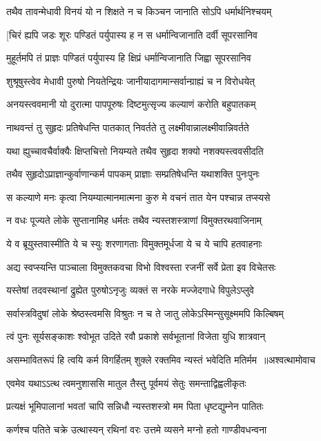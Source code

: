 \twolineshloka
{तथैव तावन्मेधावी विनयं यो न शिक्षते}
{न च किञ्चन जानाति सोऽपि धर्मार्थनिश्चयम्}


\twolineshloka
{[चिरं ह्यपि जडः शूरः पण्डितं पर्युपास्य ह}
{न स धर्मान्विजानाति दर्वी सूपरसानिव}


\twolineshloka
{मुहूर्तमपि तं प्राज्ञः पण्डितं पर्युपास्य हि}
{क्षिप्रं धर्मान्विजानाति जिह्वा सूपरसानिव}


\twolineshloka
{शुश्रूषुस्त्वेव मेधावी पुरुषो नियतेन्द्रियः}
{जानीयादागमान्सर्वान्ग्राह्यं च न विरोधयेत्}


\twolineshloka
{अनयस्त्ववमानी यो दुरात्मा पापपूरुषः}
{दिष्टमुत्सृज्य कल्याणं करोति बहुपातकम्}


\twolineshloka
{नाथवन्तं तु सुहृदः प्रतिषेधन्ति पातकात्}
{निवर्तते तु लक्ष्मीवान्नालक्ष्मीवान्निवर्तते}


\twolineshloka
{यथा ह्युच्चावचैर्वाक्यैः क्षिप्तचित्तो नियम्यते}
{तथैव सुहृदा शक्यो नशक्यस्त्ववसीदति}


\twolineshloka
{तथैव सुहृदोऽप्राज्ञान्कुर्वाणान्कर्म पापकम्}
{प्राज्ञाः सम्प्रतिषेधन्ति यथाशक्ति पुनःपुनः}


\twolineshloka
{स कल्याणे मनः कृत्वा नियम्यात्मानमात्मना}
{कुरु मे वचनं तात येन पश्चान्न तप्स्यसे}


\twolineshloka
{न वधः पूज्यते लोके सुप्तानामिह धर्मतः}
{तथैव न्यस्तशस्त्राणां विमुक्तरथवाजिनाम्}


\twolineshloka
{ये व ब्रूयुस्तवास्मीति ये च स्युः शरणागताः}
{विमुक्तमूर्धजा ये च ये चापि हतवाहनाः}


\twolineshloka
{अद्य स्वप्स्यन्ति पाञ्चाला विमुक्तकवचा विभो}
{विश्वस्ता रजनीं सर्वे प्रेता इव विचेतसः}


\twolineshloka
{यस्तेषां तदवस्थानां द्रुह्येत पुरुषोऽनृजुः}
{व्यक्तं स नरके मज्जेदगाधे विपुलेऽप्लुवे}


\twolineshloka
{सर्वास्त्रविदुषां लोके श्रेष्ठस्त्वमसि विश्रुतः}
{न च ते जातु लोकेऽस्मिन्सुसूक्ष्ममपि किल्बिषम्}


\twolineshloka
{त्वं पुनः सूर्यसङ्काशः श्वोभूत उदिते रवौ}
{प्रकाशे सर्वभूतानां विजेता युधि शात्रवान्}


\threelineshloka
{असम्भावितरूपं हि त्वयि कर्म विगर्हितम्}
{शुक्ले रक्तमिव न्यस्तं भवेदिति मतिर्मम ॥अश्वत्थामोवाच}
{}


\twolineshloka
{एवमेव यथाऽऽत्थ त्वमनुशाससि मातुल}
{तैस्तु पूर्वमयं सेतुः समन्ताद्विह्वलीकृतः}


\twolineshloka
{प्रत्यक्षं भूमिपालानां भवतां चापि सन्निधौ}
{न्यस्तशस्त्रो मम पिता धृष्टद्युम्नेन पातितः}


\twolineshloka
{कर्णश्च पतिते चक्रे उत्थास्यन् रथिनां वरः}
{उत्तमे व्यसने मग्नो हतो गाण्डीवधन्वना}


